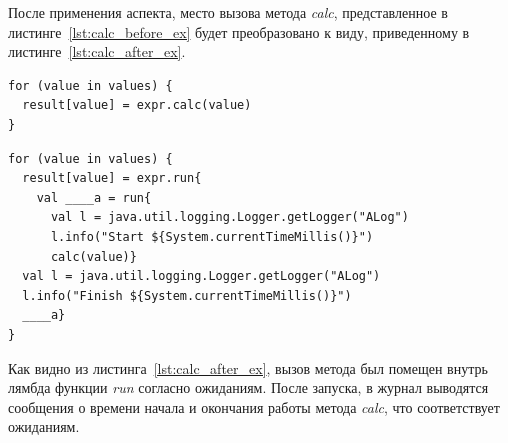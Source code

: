 \documentclass[conference]{IEEEtran}
\begin{document}
После применения аспекта, место вызова метода \textit{calc}, представленное в
листинге~\ref{lst:calc_before_ex} будет преобразовано к виду, приведенному в
листинге~\ref{lst:calc_after_ex}.
\begin{lstlisting}[label=lst:calc_before_ex,
    caption={Место вызова метода calc до применения аспекта}]
for (value in values) {
  result[value] = expr.calc(value)
}
\end{lstlisting}

\begin{lstlisting}[label=lst:calc_after_ex,
    caption={Место вызова метода calc после применения аспекта}]
for (value in values) {
  result[value] = expr.run{
    val ____a = run{
      val l = java.util.logging.Logger.getLogger("ALog")
      l.info("Start ${System.currentTimeMillis()}")
      calc(value)}
  val l = java.util.logging.Logger.getLogger("ALog")
  l.info("Finish ${System.currentTimeMillis()}")
  ____a}
}
\end{lstlisting}

Как видно из листинга~\ref{lst:calc_after_ex}, вызов метода был помещен внутрь
лямбда функции \textit{run} согласно ожиданиям.
После запуска, в журнал выводятся сообщения о времени начала и окончания работы
метода \textit{calc}, что соответствует ожиданиям.


\end{document}
